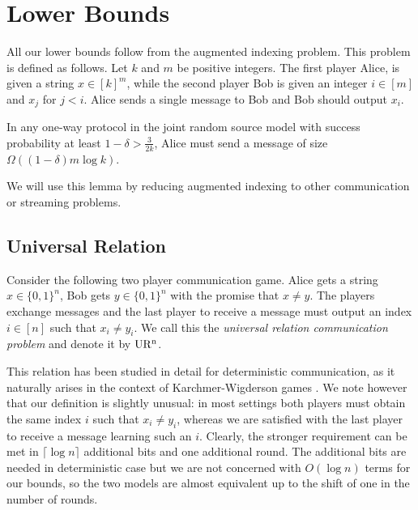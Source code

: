 \section{Lower Bounds}
\label{sec:lb}
All our lower bounds follow from the augmented indexing problem.
This problem is defined as follows. Let $k$ and $m$ be positive
integers. The first player Alice, is given a string $x\in[k]^m$,
while the second player Bob is given an integer $i\in [m]$ and
$x_j$ for $j<i$. Alice sends a single message to Bob and Bob
should output $x_i$.

\begin{lemma}
\label{lem:ai}
In any one-way protocol in the joint random source model with
success probability at least $1-\delta>\frac{3}{2k}$, Alice must
send a message of size $\Omega((1-\delta)m\log k)$.
\end{lemma}

We will use this lemma by reducing augmented indexing to other
communication or streaming problems.

%
%
\subsection{Universal Relation}
\label{sec:ur}
Consider the following two player communication game. Alice gets
a string $x\in\{0,1\}^n$, Bob gets $y\in\{0,1\}^n$ with the
promise that $x\neq y$. The players exchange messages and the
last player to receive a message must output an index $i\in [n]$
such that $x_i\neq y_i$. We call this the {\em universal
relation communication problem} and denote it by $\operatorname{UR^n}$.

This relation has been studied in detail for deterministic
communication, as it naturally arises in the context of
Karchmer-Wigderson games \cite{KarchmerW1988}. We note however
that our definition is slightly unusual: in most settings both
players must obtain the same index $i$ such that $x_i\neq y_i$,
whereas we are satisfied with the last player to receive a
message learning such an $i$. Clearly, the stronger requirement
can be met in $\lceil\log n\rceil$ additional bits and one
additional round. The additional bits are needed in
deterministic case but we are not concerned with $O(\log n)$
terms for our bounds, so the two models are almost equivalent up
to the shift of one in the number of rounds.

